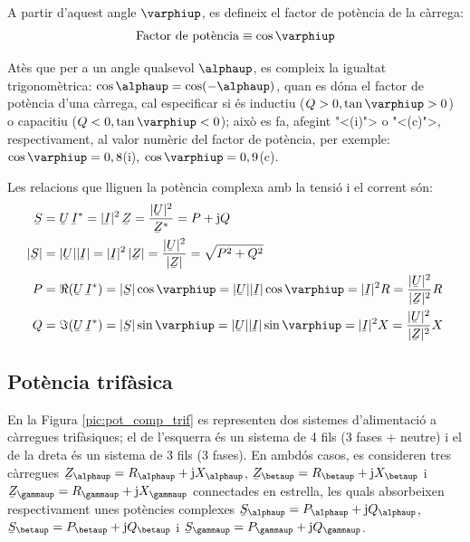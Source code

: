 A partir d'aquest angle $\varphiup$, es
defineix el factor de pot\`{e}ncia de la c\`{a}rrega:
\begin{equation}
   \text{Factor de pot\`{e}ncia} \equiv \cos\varphiup
\end{equation}

At\`{e}s que per a un angle qualsevol $\alphaup$, es compleix la igualtat
trigonom\`{e}trica: $\cos\alphaup = \cos(-\alphaup)$, quan es d\'{o}na el factor
de pot\`{e}ncia d'una c\`{a}rrega, cal especificar si \'{e}s inductiu ($Q>0,
\tan\varphiup>0$) o capacitiu ($Q<0, \tan\varphiup<0$); aix\`{o} es fa,
afegint {"<}(i){">} o {"<}(c){">}, respectivament, al valor num\`{e}ric del factor
de pot\`{e}ncia, per exemple: $\cos\varphiup=0,8$(i),
$\cos\varphiup=0,9$(c).

Les relacions que lliguen la pot\`{e}ncia complexa amb la tensi\'{o} i el corrent s\'{o}n:
\begin{align}
   \cmplx{S} &=  \cmplx{U} \,\cmplx{I}^* =
   |\cmplx{I}|^2 \,\cmplx{Z} = \frac{|\cmplx{U}|^2}{\cmplx{Z}^*} =
   P + \ju Q \label{eq:s_mono1}\\
   |\cmplx{S}| &= |\cmplx{U}| |\cmplx{I}| =
   |\cmplx{I}|^2 \,|\cmplx{Z}| = \frac{|\cmplx{U}|^2}{|\cmplx{Z}|} =
   \sqrt{P^2+Q^2} \\
   P &= \Re (\cmplx{U} \, \cmplx{I}^*) = |\cmplx{S}| \cos\varphiup =
   |\cmplx{U}| |\cmplx{I}| \cos\varphiup = |\cmplx{I}|^2 R =
   \frac{|\cmplx{U}|^2}{|\cmplx{Z}|^2}R\\
   Q &= \Im (\cmplx{U} \, \cmplx{I}^*) = |\cmplx{S}| \sin\varphiup =
   |\cmplx{U}| |\cmplx{I}|\sin\varphiup  = |\cmplx{I}|^2 X =
   \frac{|\cmplx{U}|^2}{|\cmplx{Z}|^2}X
\end{align}

\subsection{Pot\`{e}ncia trif\`{a}sica} 

En la Figura \vref{pic:pot_comp_trif} es representen dos sistemes
d'alimentaci\'{o} a c\`{a}rregues trif\`{a}siques; el de l'esquerra \'{e}s un
sistema de 4 fils (3 fases + neutre) i el de la dreta \'{e}s un sistema
de 3 fils (3 fases). En ambd\'{o}s casos, es consideren tres c\`{a}rregues
$\cmplx{Z}_\alphaup = R_\alphaup + \ju X_\alphaup$, $\cmplx{Z}_\betaup=
R_\betaup + \ju X_\betaup$ i $\cmplx{Z}_\gammaup= R_\gammaup + \ju X_\gammaup$
connectades en estrella, les quals absorbeixen respectivament unes
pot\`{e}ncies complexes $\cmplx{S}_\alphaup= P_\alphaup + \ju Q_\alphaup$,
$\cmplx{S}_\betaup= P_\betaup + \ju Q_\betaup$ i $\cmplx{S}_\gammaup=
P_\gammaup + \ju Q_\gammaup$.


